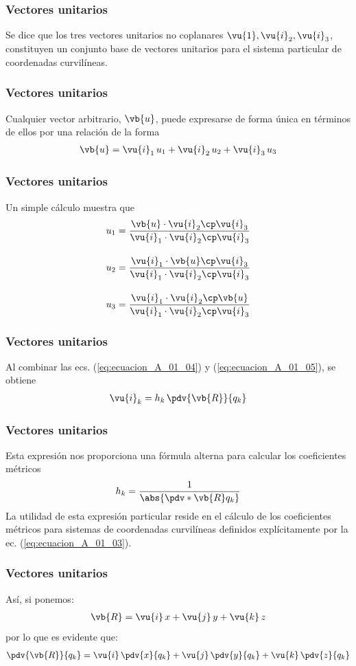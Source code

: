 \begin{frame}
\frametitle{Vectores unitarios}
Se dice que los tres vectores unitarios no coplanares $\vu{1}, \vu{i}_{2}, \vu{i}_{3}$, constituyen un conjunto base de vectores unitarios para el sistema particular de coordenadas curvilíneas.
\end{frame}
\begin{frame}
\frametitle{Vectores unitarios}
Cualquier vector arbitrario, $\vb{u}$, puede expresarse de forma única en términos de ellos por una relación de la forma
\begin{align*}
\vb{u} = \vu{i}_{1} \, u_{1} + \vu{i}_{2} \, u_{2} + \vu{i}_{3} \, u_{3}
\end{align*}
\end{frame}
\begin{frame}
\frametitle{Vectores unitarios}
Un simple cálculo muestra que
\begin{align*}
u_{1} &= \dfrac{\vb{u} \cdot \vu{i}_{2} \cp \vu{i}_{3}}{\vu{i}_{1} \cdot \vu{i}_{2} \cp \vu{i}_{3}} \\[1em]
u_{2} &= \dfrac{\vu{i}_{1} \cdot \vb{u} \cp \vu{i}_{3}}{\vu{i}_{1} \cdot \vu{i}_{2} \cp \vu{i}_{3}} \\[1em]
u_{3} &= \dfrac{\vu{i}_{1} \cdot \vu{i}_{2} \cp \vb{u}}{\vu{i}_{1} \cdot \vu{i}_{2} \cp \vu{i}_{3}}
\end{align*}
\end{frame}
\begin{frame}
\frametitle{Vectores unitarios}
Al combinar las ecs. (\ref{eq:ecuacion_A_01_04}) y (\ref{eq:ecuacion_A_01_05}), se obtiene
\begin{align}
\vu{i}_{k} = h_{k} \, \pdv{\vb{R}}{q_{k}}
\label{eq:ecuacion_A_01_07}
\end{align}
\end{frame}
\begin{frame}
\frametitle{Vectores unitarios}
Esta expresión nos proporciona una fórmula alterna para calcular los coeficientes métricos
\begin{align}
h_{k} = \dfrac{1}{\abs{\pdv*{\vb{R}}{q_{k}}}}
\label{eq:ecuacion_A_01_08}    
\end{align}
\pause
La utilidad de esta expresión particular reside en el cálculo de los coeficientes métricos para sistemas de coordenadas curvilíneas definidos explícitamente por la ec. (\ref{eq:ecuacion_A_01_03}).
\end{frame}
\begin{frame}
\frametitle{Vectores unitarios}
Así, si ponemos:
\begin{align*}
\vb{R} = \vu{i} \, x + \vu{j} \, y + \vu{k} \, z
\end{align*}
por lo que es evidente que:
\begin{align*}
\pdv{\vb{R}}{q_{k}} = \vu{i} \, \pdv{x}{q_{k}} + \vu{j} \, \pdv{y}{q_{k}} + \vu{k} \, \pdv{z}{q_{k}}
\end{align*}
\end{frame}
